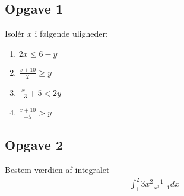 \subsection*{Opgave 1}

Isolér $x$ i følgende uligheder:

\begin{enumerate}[label=\roman*)]
	\item  $2x \leq 6-y$
	\item  $\frac{x+10}{2} \geq y $
	\item  $\frac{x}{-3}+5 < 2y$
	\item  $ \frac{x+10}{-5} > y $
\end{enumerate}

\subsection*{Opgave 2}

Bestem værdien af integralet
\begin{align*}
	\int_1^2 3x^2\frac{1}{x^3+1}dx
\end{align*}